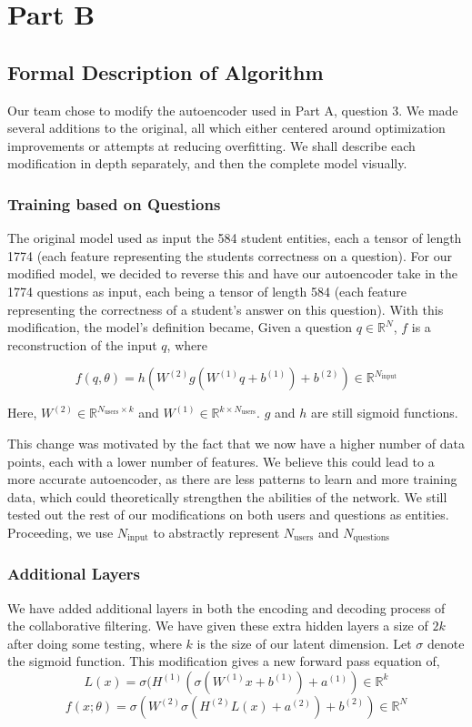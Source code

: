 \documentclass{article}
\begin{document}
\section{Part B}
\subsection{Formal Description of Algorithm}
Our team chose to modify the autoencoder used in Part A, question 3. We made several additions to the original, all which either centered around optimization improvements or attempts at reducing overfitting. We shall describe each modification in depth separately, and then the complete model visually.
\subsubsection{Training based on Questions}
The original model used as input the 584 student entities, each a tensor of length 1774 (each feature representing the students correctness on a question). For our modified model, we decided to reverse this and have our autoencoder take in the 1774 questions as input, each being a tensor of length 584 (each feature representing the correctness of a student's answer on this question). With this modification, the model's definition became,
Given a question $q \in \mathbb{R}^{N}$, $f$ is a reconstruction of the input $q$, where 

$$f(q, \theta) = h(W^{(2)}g(W^{(1)}q + b^{(1)}) + b^{(2)}) \in \mathbb{R}^{N_{\text{input}}}$$

Here, $W^{(2)} \in \mathbb{R}^{N_{\text{users}}\times k}$ and $W^{(1)} \in \mathbb{R}^{k\times N_{\text{users}}}$. $g$ and $h$ are still sigmoid functions. 

This change was motivated by the fact that we now have a higher number of data points, each with a lower number of features. We believe this could lead to a more accurate autoencoder, as there are less patterns to learn and more training data, which could theoretically strengthen the abilities of the network. We still tested out the rest of our modifications on both users and questions as entities. Proceeding, we use $N_{\text{input}}$ to abstractly represent $N_{\text{users}}$ and $N_{\text{questions}}$
\subsubsection{Additional Layers}
We have added additional layers in both the encoding and decoding process of the collaborative filtering. We have given these extra hidden layers a size of $2k$ after doing some testing, where $k$ is the size of our latent dimension. Let $\sigma$ denote the sigmoid function. This modification gives a new forward pass equation of,
$$L(x) = \sigma(H^{(1)}(\sigma(W^{(1)}x + b^{(1)}) + a^{(1)}) \in \mathbb{R}^{k}$$
$$f(x; \theta) = \sigma(W^{(2)}\sigma(H^{(2)}L(x) + a^{(2)}) + b^{(2)}) \in \mathbb{R}^N$$
\end{document}
